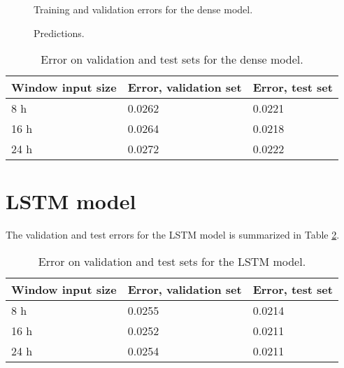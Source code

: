 \begin{figure}[h]
\centering
{}
\caption{Training and validation errors for the dense model.}
\label{fig:train-error-dense}
\end{figure}


\begin{figure}[htbp]
\begin{center}
\caption{Predictions.}
\label{fig:pred-dense}
\end{center}
\end{figure}

\begin{table}[h]
\centering
\caption{Error on validation and test sets for the dense model. }
\label{tab:errors-dense}
\begin{tabular}{@{}lll@{}}
\toprule
Window input size & Error, validation set & Error, test set \\ \midrule
8 h        & 0.0262                & 0.0221          \\
16 h       & 0.0264                & 0.0218          \\
24 h       & 0.0272                & 0.0222          \\ \bottomrule
\end{tabular}
\end{table}

\section{LSTM model}

The validation and test errors for the LSTM model is summarized in Table \ref{tab:errors-LSTM}. 

\begin{table}[h]
\centering
\caption{Error on validation and test sets for the LSTM model. }
\label{tab:errors-LSTM}
\begin{tabular}{@{}lll@{}}
\toprule
Window input size & Error, validation set & Error, test set \\ \midrule
8 h               & 0.0255                & 0.0214          \\
16 h              & 0.0252                & 0.0211          \\
24 h              & 0.0254                & 0.0211          \\ \bottomrule
\end{tabular}
\end{table}

